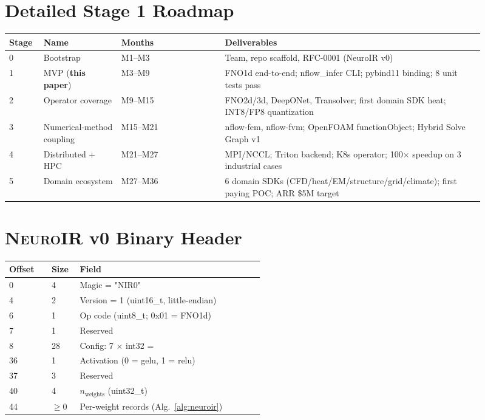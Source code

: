 \documentclass[10pt,twocolumn]{article}
\renewcommand{\texttt}[1]{{\normalfont\ttfamily #1}\normalfont\rmfamily}
\newcommand{\neuroir}{\textsc{NeuroIR}}
\begin{document}
\section{Detailed Stage 1 Roadmap}
\label{app:roadmap}

\begin{table}[h]
  \centering
  \small
  \begin{tabular}{p{0.06\linewidth}p{0.15\linewidth}p{0.20\linewidth}p{0.50\linewidth}}
    \toprule
    Stage & Name & Months & Deliverables\\
    \midrule
    0 & Bootstrap & M1--M3 &
      Team, repo scaffold, RFC-0001 (NeuroIR v0)\\
    1 & MVP (\textbf{this paper}) & M3--M9 &
      FNO1d end-to-end; \texttt{nflow\_infer} CLI;
      pybind11 binding; 8 unit tests pass\\
    2 & Operator coverage & M9--M15 &
      FNO2d/3d, DeepONet, Transolver; first domain SDK
      \texttt{heat}; INT8/FP8 quantization\\
    3 & Numerical-method coupling & M15--M21 &
      \texttt{nflow-fem}, \texttt{nflow-fvm}; OpenFOAM
      \texttt{functionObject}; Hybrid Solve Graph v1\\
    4 & Distributed + HPC & M21--M27 &
      MPI/NCCL; Triton backend; K8s operator; 100$\times$
      speedup on 3 industrial cases\\
    5 & Domain ecosystem & M27--M36 &
      6 domain SDKs (CFD/heat/EM/structure/grid/climate);
      first paying POC; ARR \$5M target\\
    \bottomrule
  \end{tabular}
\end{table}

\section{\neuroir{} v0 Binary Header}
\label{app:neuroir}

\begin{table}[h]
  \centering
  \small
  \begin{tabular}{p{0.15\linewidth}p{0.10\linewidth}p{0.65\linewidth}}
    \toprule
    Offset & Size & Field\\
    \midrule
    0 & 4 & Magic = \texttt{"NIR0"} \\
    4 & 2 & Version = 1 (\texttt{uint16\_t}, little-endian)\\
    6 & 1 & Op code (\texttt{uint8\_t}; 0x01 = FNO1d)\\
    7 & 1 & Reserved\\
    8 & 28 & Config: 7 $\times$ \texttt{int32} =
      \texttt{[in\_ch, out\_ch, width, modes, n\_layers, pad\_factor, \_]}\\
    36 & 1 & Activation (0 = gelu, 1 = relu)\\
    37 & 3 & Reserved\\
    40 & 4 & $n_\text{weights}$ (\texttt{uint32\_t})\\
    44 & $\geq 0$ & Per-weight records (Alg.~\ref{alg:neuroir})\\
    \bottomrule
  \end{tabular}
\end{table}
\end{document}
